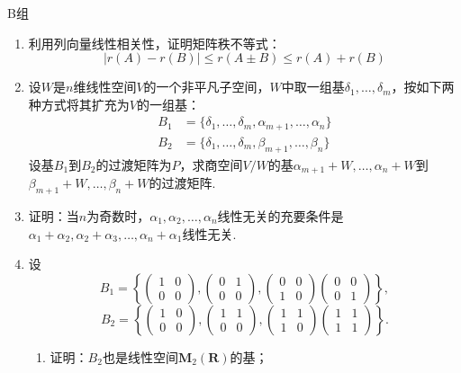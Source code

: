 \centerline{\heiti B组}
\begin{enumerate}
    \item 利用列向量线性相关性，证明矩阵秩不等式：\[|r(A)-r(B)|\leqslant r(A\pm B) \leqslant r(A)+r(B)\]

    \item 设$W$是$n$维线性空间$V$的一个非平凡子空间，$W$中取一组基$\delta_1,\ldots,\delta_m$，按如下两种方式将其扩充为$V$的一组基：
          \begin{align*}
              B_1 & =\{\delta_1,\ldots,\delta_m,\alpha_{m+1},\ldots,\alpha_n\} \\
              B_2 & =\{\delta_1,\ldots,\delta_m,\beta_{m+1},\ldots,\beta_n\}
          \end{align*}
          设基$B_1$到$B_2$的过渡矩阵为$P$，求商空间$V/W$的基$\alpha_{m+1}+W,\ldots,\alpha_n+W$到$\beta_{m+1}+W,\ldots,\beta_n+W$的过渡矩阵.

    \item 证明：当$n$为奇数时，$\alpha_1,\alpha_2,\ldots,\alpha_n$线性无关的充要条件是$\alpha_1+\alpha_2,\alpha_2+\alpha_3,\ldots,\alpha_n+\alpha_1$线性无关.

    \item 设
          \[B_1=\left\{\begin{pmatrix}
                  1 & 0 \\ 0 & 0
              \end{pmatrix},\begin{pmatrix}
                  0 & 1 \\ 0 & 0
              \end{pmatrix},\begin{pmatrix}
                  0 & 0 \\ 1 & 0
              \end{pmatrix}\begin{pmatrix}
                  0 & 0 \\ 0 & 1
              \end{pmatrix}\right\},\]
          \[B_2=\left\{\begin{pmatrix}
                  1 & 0 \\ 0 & 0
              \end{pmatrix},\begin{pmatrix}
                  1 & 1 \\ 0 & 0
              \end{pmatrix},\begin{pmatrix}
                  1 & 1 \\ 1 & 0
              \end{pmatrix}\begin{pmatrix}
                  1 & 1 \\ 1 & 1
              \end{pmatrix}\right\}.\]
          \begin{enumerate}
              \item 证明：$B_2$也是线性空间$\mathbf{M}_2(\mathbf{R})$的基；


\end{enumerate}
\end{enumerate}
